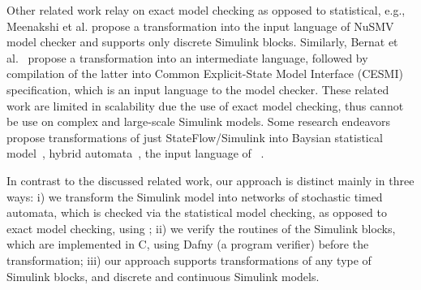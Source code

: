 Other related work relay on exact model checking as opposed to statistical, e.g., Meenakshi et al. \cite{Meenakshi2006ToolChecker} propose a transformation into the input language of NuSMV model checker and supports only discrete Simulink blocks. Similarly, Bernat et al.~\cite{Barnat2012ToolDesigns} propose a transformation into an intermediate language, followed by compilation of the latter into Common Explicit-State Model Interface (CESMI) specification, which is an input language to the \devine{} model checker. These related work are limited in scalability due the use of exact model checking, thus cannot be use on complex and large-scale Simulink models. Some research endeavors propose transformations of just StateFlow/Simulink into Baysian statistical model~\cite{Zuliani2010BayesianVerification}, hybrid automata~\cite{ManamcheriSukumar2011TranslationAutomata}, the input language of \uppaal{}~\cite{Jiang2016FromDesign}. 

In contrast to the discussed related work, our approach is distinct mainly in three ways: i) we transform the Simulink model into networks of stochastic timed automata, which is checked via the statistical model checking, as opposed to exact model checking, using \uppaalsmc; ii) we verify the routines of the Simulink blocks, which are implemented in C, using Dafny (a program verifier) before the transformation; iii) our approach supports transformations of any type of Simulink blocks, and discrete and continuous Simulink models.



